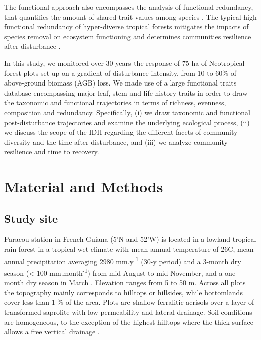 \documentclass[fleqn,10pt]{ArtEcoFoG} %
\begin{document}
The functional approach also encompasses the analysis of functional
redundancy, that quantifies the amount of shared trait values among
species \citep{Carmona2016}. The typical high functional redundancy of
hyper-diverse tropical forests \citep{Bellwood2006} mitigates the
impacts of species removal on ecosystem functioning and determines
communities resilience after disturbance \citep{Elmqvist2003, Diaz2005}.

In this study, we monitored over 30 years the response of 75 ha of
Neotropical forest plots set up on a gradient of disturbance intensity,
from 10 to 60\% of above-ground biomass (AGB) loss. We made use of a
large functional traits database encompassing major leaf, stem and
life-history traits in order to draw the taxonomic and functional
trajectories in terms of richness, evenness, composition and redundancy.
Specifically, (i) we draw taxonomic and functional post-disturbance
trajectories and examine the underlying ecological process, (ii) we
discuss the scope of the IDH regarding the different facets of community
diversity and the time after disturbance, and (iii) we analyze community
resilience and time to recovery.

\section{Material and Methods}\label{material-and-methods}

\subsection{Study site}\label{study-site}

Paracou station in French Guiana (5'N and
52'W) is located in a lowland tropical rain forest in a
tropical wet climate with mean annual temperature of 26\textdegree C,
mean annual precipitation averaging 2980 mm.y\textsuperscript{-1} (30-y
period) and a 3-month dry season (\textless{} 100
mm.month\textsuperscript{-1}) from mid-August to mid-November, and a
one-month dry season in March \citep{Wagner2011}. Elevation ranges from
5 to 50 m. Across all plots the topography mainly corresponds to
hilltops or hillsides, while bottomlands cover less than 1 \% of the
area. Plots are shallow ferralitic acrisols over a layer of transformed
saprolite with low permeability and lateral drainage. Soil conditions
are homogeneous, to the exception of the highest hilltops where the
thick surface allows a free vertical drainage
\citep{Gourlet-Fleury2004}.
\end{document}
